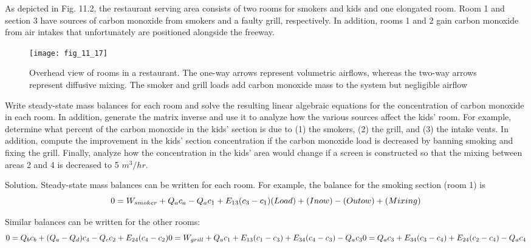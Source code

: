 \documentclass[../main.tex]{subfiles}
\begin{document}
As depicted in Fig. 11.2, the restaurant serving area consists of two rooms for smokers
and kids and one elongated room. Room 1 and section 3 have sources of carbon monoxide
from smokers and a faulty grill, respectively. In addition, rooms 1 and 2 gain carbon
monoxide from air intakes that unfortunately are positioned alongside the freeway. 
\begin{figure}[H]
	\centering
	\texttt{[image: fig\_11\_17]}
	\caption{\textsf{Overhead view of rooms in a restaurant. The one-way arrows represent volumetric airflows,
whereas the two-way arrows represent diffusive mixing. The smoker and grill loads add carbon
monoxide mass to the system but negligible airflow}}
	\label{fig:fig_11_17}
\end{figure}

Write steady-state mass balances for each room and solve the resulting linear algebraic equations for the concentration of carbon monoxide in each room. In addition, generate the matrix inverse and use it to analyze how the various sources affect the kids'
room. For example, determine what percent of the carbon monoxide in the kids' section is
due to (1) the smokers, (2) the grill, and (3) the intake vents. In addition, compute the improvement in the kids' section concentration if the carbon monoxide load is decreased by
banning smoking and fixing the grill. Finally, analyze how the concentration in the kids'
area would change if a screen is constructed so that the mixing between areas 2 and 4 is
decreased to 5 $m^{3}/hr$.

Solution. Steady-state mass balances can be written for each room. For example, the balance for the smoking section (room 1) is
\begin{equation}
0 = W_{smoker} + Q_{a}c_{a} - Q_{a}c_{1} + E_{13}(c_{3} - c_{1})\\
(Load) + (In o w) - (Out o w) + (Mixing)
\end{equation}

Similar balances can be written for the other rooms:
\begin{equation}
0 = Q_{b}c_{b} + (Q_{a} - Q_{d})c_{4} - Q_{c}c_{2} + E_{24}(c_{4} - c_{2})\\
0 = W_{grill} + Q_{a}c_{1} + E_{13}(c_{1} - c_{3}) + E_{34}(c_{4} - c_{3}) - Q_{a}c_{3}\\
0 = Q_{a}c_{3} + E_{34}(c_{3} - c_{4}) + E_{24}(c_{2} - c_{4}) - Q_{a}c_{4}
\end{equation}
\end{document}
